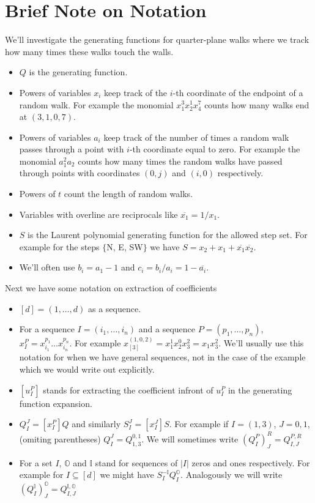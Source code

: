 \documentclass[12pt]{article}
\newcommand{\oo}{\mathbb{O}}
\newcommand{\one}{\mathbb{I}}
\theoremstyle{definition} \newtheorem{definition}[theorem]{Definition}
\newcommand{\ol}[1]{\overline{#1}}
\begin{document}
\tableofcontents

\section{Brief Note on Notation}

We'll investigate the generating functions for quarter-plane walks where we track how many times these walks touch the walls. 
\begin{itemize}
\item $Q$ is the generating function.
\item Powers of variables $x_i$ keep track of the $i$-th coordinate of the endpoint of a random walk. For example the monomial $x_1^3x_2^1x_4^7$ counts how many walks end at $(3,1,0,7)$.
\item Powers of variables $a_i$ keep track of the number of times a random walk passes through a point with $i$-th coordinate equal to zero. For example the monomial $a_1^2a_2$ counts how many times the random walks have passed through points with coordinates $(0,j)$ and $(i,0)$ respectively.
\item Powers of $t$ count the length of random walks.
\item Variables with overline are reciprocals like $\ol{x_1} = 1/x_1$.
\item $S$ is the Laurent polynomial generating function for the allowed step set. For example for the steps $\{$N, E, SW$\}$ we have $S = x_2 + x_1+\ol{x_1}\ol{x_2}$.
\item We'll often use $b_i = a_1-1$ and $c_i = b_i/a_i = 1-\ol{a_i}$.
\end{itemize}
Next we have some notation on extraction of coefficients
\begin{itemize}
\item $[d] = (1,\ldots,d)$ as a sequence.
\item For a sequence $I = (i_1,\ldots, i_n)$ and a sequence $P = (p_1,\ldots,p_n)$, $x_I^P = x_{i_1}^{p_1}\ldots x_{i_n}^{p_n}$. For example $x_{[3]}^{(1,0,2)} = x_1^1x_2^0x_3^2 = x_1x_3^2$. We'll usually use this notation for when we have general sequences, not in the case of the example which we would write out explicitly.
\item $[u_I^P]$ stands for extracting the coefficient infront of $u_I^P$ in the generating function expansion.
\item $Q_{I}^J = [x_I^P]Q$ and similarly $S_I^J =[x_I^J]S$. For example if $I = (1,3)$, $J = {0,1}$, (omiting parentheses) $Q_I^J = Q_{1,3}^{0,1}$. We will sometimes write $(Q_I^P)_J^R = Q_{I,J}^{P,R}$
\item For a set $I$, $\oo$ and $\one$ stand for sequences of $|I|$ zeros and ones respectively. For example for $I \subseteq [d]$ we might have $S_I^{-\one}Q_I^{\oo}$. Analogously we will write $(Q_I^{\one})_J^\oo = Q_{I,J}^{\one,\oo}$
\end{itemize}
\end{document}
